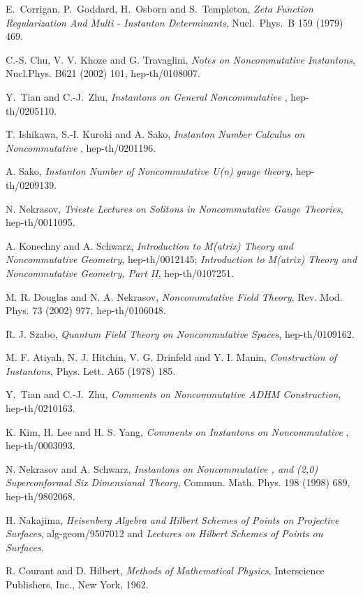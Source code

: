 \documentclass[a4paper,a4paper]{article}
\begin{document}
\begin{thebibliography}{99}

 E.~Corrigan, P.~Goddard, H.~Osborn and S.~Templeton,
\textit{Zeta Function Regularization And Multi - Instanton
Determinants}, Nucl.\ Phys.\ B 159 (1979) 469.

 C.-S. Chu, V. V. Khoze and G. Travaglini, \textit{Notes on
Noncommutative Instantons}, Nucl.Phys. B621 (2002) 101, hep-th/0108007.

 Y.~Tian and C.-J.~Zhu, \textit{Instantons on General
Noncommutative \coordHE{}}, hep-th/0205110.

 T. Ishikawa, S.-I. Kuroki and A. Sako, \textit{Instanton
Number Calculus on Noncommutative \coordHE{}}, hep-th/0201196.

 A. Sako, \textit{Instanton Number of Noncommutative U(n) gauge
theory}, hep-th/0209139.

 N. Nekrasov, \textit{Trieste Lectures on Solitons in
Noncommutative Gauge Theories}, hep-th/0011095.

 A. Konechny and A. Schwarz, \textit{Introduction to
M(atrix) Theory and Noncommutative Geometry}, hep-th/0012145; \textit{%
Introduction to M(atrix) Theory and Noncommutative Geometry, Part II},
hep-th/0107251.

 M. R. Douglas and N. A. Nekrasov, \textit{Noncommutative
Field Theory}, Rev. Mod. Phys. 73 (2002) 977, hep-th/0106048.

 R. J. Szabo, \textit{Quantum Field Theory on
Noncommutative Spaces}, hep-th/0109162.

 M. F. Atiyah, N. J. Hitchin, V. G. Drinfeld and Y. I. Manin,
\textit{Construction of Instantons}, Phys. Lett. A65 (1978) 185.

 Y.~Tian and C.-J.~Zhu, \textit{Comments on Noncommutative ADHM Construction}, hep-th/0210163.

 K. Kim, H. Lee and H. S. Yang, {\it Comments on
Instantons on Noncommutative \coordHE{}}, hep-th/0003093.

 N. Nekrasov and A. Schwarz, \textit{Instantons on
Noncommutative \coordHE{}, and (2,0) Superconformal Six Dimensional Theory},
Commun. Math. Phys. 198 (1998) 689, hep-th/9802068.

 H. Nakajima, \textit{Heisenberg Algebra and Hilbert
Schemes of Points on Projective Surfaces}, alg-geom/9507012 and \textit{%
Lectures on Hilbert Schemes of Points on Surfaces}.

 R. Courant and D. Hilbert, \textit{Methods of
Mathematical Physics}, Interscience Publishers, Inc., New York,
1962.

\end{thebibliography}
\end{document}
